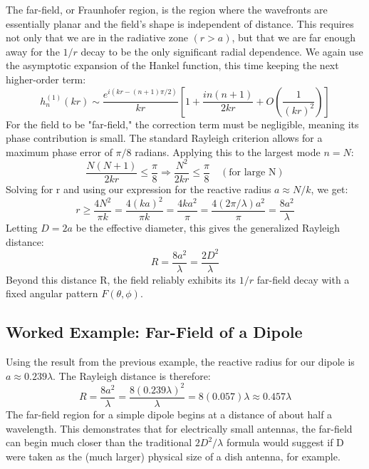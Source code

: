 \documentclass[11pt,a4paper]{article}
\begin{document}
The far-field, or Fraunhofer region, is the region where the wavefronts are essentially planar and the field's shape is independent of distance. This requires not only that we are in the radiative zone \((r>a)\), but that we are far enough away for the \(1/r\) decay to be the only significant radial dependence.
We again use the asymptotic expansion of the Hankel function, this time keeping the next higher-order term:
\begin{equation}
    h_{n}^{(1)}(kr)\sim\frac{e^{i(kr-(n+1)\pi/2)}}{kr}\left[1+\frac{in(n+1)}{2kr}+O\left(\frac{1}{(kr)^{2}}\right)\right]
\end{equation}
For the field to be "far-field," the correction term must be negligible, meaning its phase contribution is small. The standard Rayleigh criterion allows for a maximum phase error of \(\pi/8\) radians. Applying this to the largest mode \(n=N\):
\begin{equation}
    \frac{N(N+1)}{2k r}\le\frac{\pi}{8} \Rightarrow \frac{N^{2}}{2k r}\le\frac{\pi}{8} \quad (\text{for large N})
\end{equation}
Solving for r and using our expression for the reactive radius \(a\approx N/k\), we get:
\begin{equation}
    r\ge\frac{4N^{2}}{\pi k}=\frac{4(ka)^{2}}{\pi k}=\frac{4ka^{2}}{\pi}=\frac{4(2\pi/\lambda)a^{2}}{\pi}=\frac{8a^{2}}{\lambda}
\end{equation}
Letting \(D=2a\) be the effective diameter, this gives the generalized Rayleigh distance:
\begin{equation}
    R=\frac{8a^{2}}{\lambda}=\frac{2D^{2}}{\lambda}
\end{equation}
Beyond this distance R, the field reliably exhibits its \(1/r\) far-field decay with a fixed angular pattern \(F(\theta,\phi)\).

\subsection{Worked Example: Far-Field of a Dipole}

Using the result from the previous example, the reactive radius for our dipole is \(a\approx0.239\lambda\). The Rayleigh distance is therefore:
\begin{equation}
    R=\frac{8a^{2}}{\lambda}=\frac{8(0.239\lambda)^{2}}{\lambda}=8(0.057)\lambda\approx0.457\lambda
\end{equation}
The far-field region for a simple dipole begins at a distance of about half a wavelength. This demonstrates that for electrically small antennas, the far-field can begin much closer than the traditional \(2D^{2}/\lambda\) formula would suggest if D were taken as the (much larger) physical size of a dish antenna, for example.
\end{document}
